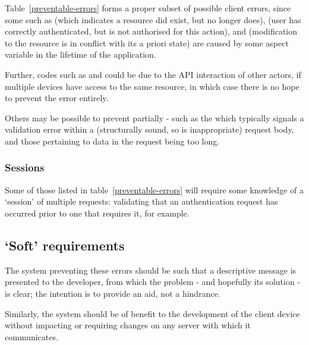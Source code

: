 Table~\ref{preventable-errors} forms a proper subset of possible client errors, since some such as  (which indicates a resource did exist, but no longer does),  (user has correctly authenticated, but is not authorised for this action), and  (modification to the resource is in conflict with its a priori state) are caused by some aspect variable in the lifetime of the application.

Further, codes such as  and  could be due to the API interaction of other actors, if multiple devices have access to the same resource, in which case there is no hope to prevent the error entirely.

Others may be possible to prevent partially - such as the  which typically signals a validation error within a (structurally sound, so  is inappropriate) request body, and those pertaining to data in the request being too long.

\subsubsection{Sessions}\label{sessions}
Some of those listed in table~\ref{preventable-errors} will require some knowledge of a `session' of multiple requests: validating that an authentication request has occurred prior to one that requires it, for example.

\subsection{`Soft' requirements}\label{soft-reqs}
The system preventing these errors should be such that a descriptive message is presented to the developer, from which the problem - and hopefully its solution - is clear; the intention is to provide an aid, not a hindrance.

Similarly, the system should be of benefit to the development of the client device without impacting or requiring changes on any server with which it communicates.
